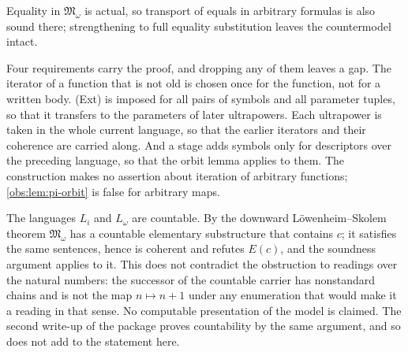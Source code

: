 Equality in $\mathfrak{M}_\omega$ is actual, so transport of equals in
arbitrary formulas is also sound there; strengthening  to full
equality substitution leaves the countermodel intact.

\begin{remark}
\label{obs:rem:pi-needs}
Four requirements carry the proof, and dropping any of them leaves a gap. The
iterator of a function that is not old is chosen once for the function, not for
a written body. (Ext) is imposed for all pairs of symbols and all parameter
tuples, so that it transfers to the parameters of later ultrapowers. Each
ultrapower is taken in the whole current language, so that the earlier
iterators and their coherence are carried along. And a stage adds symbols only
for descriptors over the preceding language, so that the orbit lemma applies to
them. The construction makes no assertion about iteration of arbitrary
functions; \cref{obs:lem:pi-orbit} is false for arbitrary maps.
\end{remark}

\begin{remark}
The languages $L_i$ and $L_\omega$ are countable. By the downward
L\"owenheim--Skolem theorem $\mathfrak{M}_\omega$ has a countable elementary
substructure that contains $c$; it satisfies the same sentences, hence is
coherent and refutes $E(c)$, and the soundness argument applies to it. This
does not contradict the obstruction to readings over the natural numbers: the
successor of the countable carrier has nonstandard chains and is not the map
$n\mapsto n+1$ under any enumeration that would make it a reading in that
sense. No computable presentation of the model is claimed. The second write-up
of the package proves countability by the same argument, and so does not add to
the statement here.
\end{remark}

